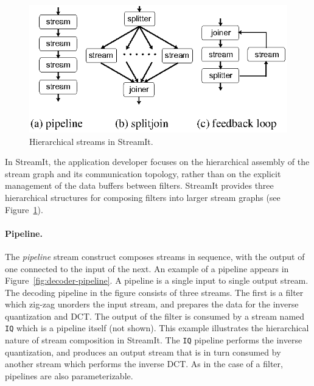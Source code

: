 \begin{figure}[t]
\begin{center}
 \includegraphics[scale=1, angle=0]{./constructs-eg.eps}
 \caption{Hierarchical streams in StreamIt.}
 \label{fig:containers}
\end{center}
\end{figure}

In StreamIt, the application developer focuses on the hierarchical
assembly of the stream graph and its communication topology, rather
than on the  explicit management of the data buffers between filters.
StreamIt provides three hierarchical structures for composing filters
into larger stream graphs (see Figure~\ref{fig:containers}).

\paragraph{Pipeline.}
The {\it pipeline} stream construct composes streams in sequence, with
the output of one connected to the input of the next.  An example of a
pipeline appears in Figure~\ref{fig:decoder-pipeline}. A pipeline is a
single input to single output stream. The decoding pipeline in the
figure consists of three streams. The first is a filter which zig-zag
unorders the input stream, and prepares the data for the inverse
quantization and DCT. The output of the filter is consumed by a stream
named {\tt IQ} which is a pipeline itself (not shown). This example
illustrates the hierarchical nature of stream composition in
StreamIt. The {\tt IQ} pipeline performs the inverse quantization, and
produces an output stream that is in turn consumed by another stream
which performs the inverse DCT. As in the case of a filter, pipelines
are also parameterizable.

